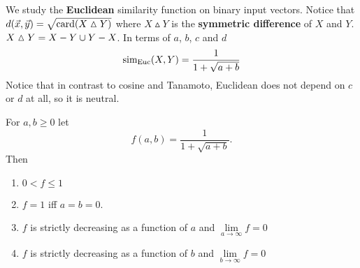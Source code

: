 \documentclass{article}
\begin{document}
\begin{example} We study the \textbf{Euclidean} similarity function on binary
input vectors. Notice that $d(\vec{x},\vec{y}) = \sqrt{\operatorname{card}(X\vartriangle Y)}$ where
$X \vartriangle Y$ is the \textbf{symmetric difference} of $X$ and $Y$.
$X\vartriangle Y = X - Y \cup Y - X$. In terms of $a$, $b$, $c$ and $d$
\begin{equation}
\operatorname{sim_{Euc}}(X,Y) = \frac{1}{1+\sqrt{a+b}}
\end{equation}
Notice that in contrast to cosine and Tanamoto, Euclidean does not depend on $c$
or $d$
at all, so it is neutral.
\end{example}
\begin{proposition}
For $a,b\geq 0$  let 
\begin{equation}
f(a,b)=\frac{1}{1+\sqrt{a+b}}.
\end{equation}
Then
\begin{enumerate}
  \item $0<f\leq 1$
  \item $f=1$ iff $a=b=0$.
  \item $f$ is strictly decreasing as a function of $a$ and
  $\lim\limits_{a\to\infty}f=0$
  \item $f$ is strictly decreasing as a function of $b$ and
  $\lim\limits_{b\to\infty}f=0$
\end{enumerate}
\end{proposition}
\end{document}
